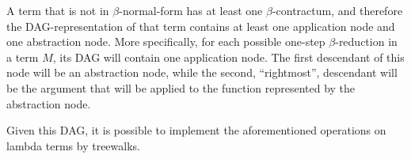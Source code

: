 A term that is not in $\beta$-normal-form has at least one $\beta$-contractum,
and therefore the DAG-representation of that term contains at least one
application node and one abstraction node. More specifically, for each
possible one-step $\beta$-reduction in a term $M$, its DAG will contain one
application node. The first descendant of this node will be an abstraction
node, while the second, ``rightmost'', descendant will be the argument that
will be applied to the function represented by the abstraction node.

Given this DAG, it is possible to implement the aforementioned operations on lambda
terms by treewalks. 










%

